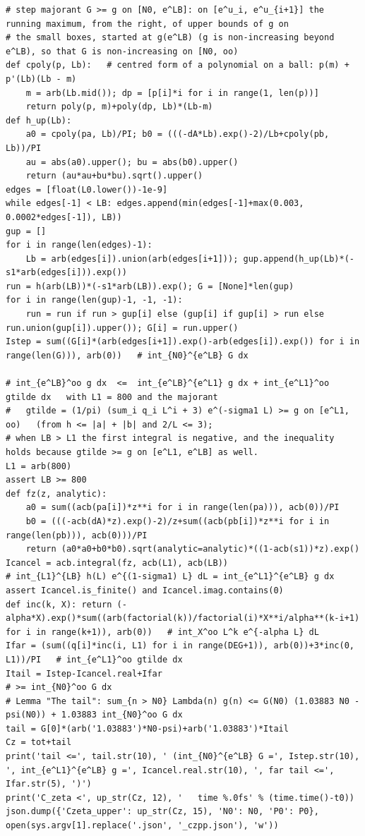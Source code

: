 \documentclass[11pt,reqno]{amsart}
\numberwithin{equation}{section}
\theoremstyle{definition}
\theoremstyle{remark}
\begin{document}
\begin{lstlisting}
# step majorant G >= g on [N0, e^LB]: on [e^u_i, e^u_{i+1}] the running maximum, from the right, of upper bounds of g on
# the small boxes, started at g(e^LB) (g is non-increasing beyond e^LB), so that G is non-increasing on [N0, oo)
def cpoly(p, Lb):   # centred form of a polynomial on a ball: p(m) + p'(Lb)(Lb - m)
    m = arb(Lb.mid()); dp = [p[i]*i for i in range(1, len(p))]
    return poly(p, m)+poly(dp, Lb)*(Lb-m)
def h_up(Lb):
    a0 = cpoly(pa, Lb)/PI; b0 = (((-dA*Lb).exp()-2)/Lb+cpoly(pb, Lb))/PI
    au = abs(a0).upper(); bu = abs(b0).upper()
    return (au*au+bu*bu).sqrt().upper()
edges = [float(L0.lower())-1e-9]
while edges[-1] < LB: edges.append(min(edges[-1]+max(0.003, 0.0002*edges[-1]), LB))
gup = []
for i in range(len(edges)-1):
    Lb = arb(edges[i]).union(arb(edges[i+1])); gup.append(h_up(Lb)*(-s1*arb(edges[i])).exp())
run = h(arb(LB))*(-s1*arb(LB)).exp(); G = [None]*len(gup)
for i in range(len(gup)-1, -1, -1):
    run = run if run > gup[i] else (gup[i] if gup[i] > run else run.union(gup[i]).upper()); G[i] = run.upper()
Istep = sum((G[i]*(arb(edges[i+1]).exp()-arb(edges[i]).exp()) for i in range(len(G))), arb(0))   # int_{N0}^{e^LB} G dx

# int_{e^LB}^oo g dx  <=  int_{e^LB}^{e^L1} g dx + int_{e^L1}^oo gtilde dx   with L1 = 800 and the majorant
#   gtilde = (1/pi) (sum_i q_i L^i + 3) e^(-sigma1 L) >= g on [e^L1, oo)   (from h <= |a| + |b| and 2/L <= 3);
# when LB > L1 the first integral is negative, and the inequality holds because gtilde >= g on [e^L1, e^LB] as well.
L1 = arb(800)
assert LB >= 800
def fz(z, analytic):
    a0 = sum((acb(pa[i])*z**i for i in range(len(pa))), acb(0))/PI
    b0 = (((-acb(dA)*z).exp()-2)/z+sum((acb(pb[i])*z**i for i in range(len(pb))), acb(0)))/PI
    return (a0*a0+b0*b0).sqrt(analytic=analytic)*((1-acb(s1))*z).exp()
Icancel = acb.integral(fz, acb(L1), acb(LB))                               # int_{L1}^{LB} h(L) e^{(1-sigma1) L} dL = int_{e^L1}^{e^LB} g dx
assert Icancel.is_finite() and Icancel.imag.contains(0)
def inc(k, X): return (-alpha*X).exp()*sum((arb(factorial(k))/factorial(i)*X**i/alpha**(k-i+1) for i in range(k+1)), arb(0))   # int_X^oo L^k e^{-alpha L} dL
Ifar = (sum((q[i]*inc(i, L1) for i in range(DEG+1)), arb(0))+3*inc(0, L1))/PI   # int_{e^L1}^oo gtilde dx
Itail = Istep-Icancel.real+Ifar                                            # >= int_{N0}^oo G dx
# Lemma "The tail": sum_{n > N0} Lambda(n) g(n) <= G(N0) (1.03883 N0 - psi(N0)) + 1.03883 int_{N0}^oo G dx
tail = G[0]*(arb('1.03883')*N0-psi)+arb('1.03883')*Itail
Cz = tot+tail
print('tail <=', tail.str(10), ' (int_{N0}^{e^LB} G =', Istep.str(10), ', int_{e^L1}^{e^LB} g =', Icancel.real.str(10), ', far tail <=', Ifar.str(5), ')')
print('C_zeta <', up_str(Cz, 12), '   time %.0fs' % (time.time()-t0))
json.dump({'Czeta_upper': up_str(Cz, 15), 'N0': N0, 'P0': P0}, open(sys.argv[1].replace('.json', '_czpp.json'), 'w'))
\end{lstlisting}
\end{document}
